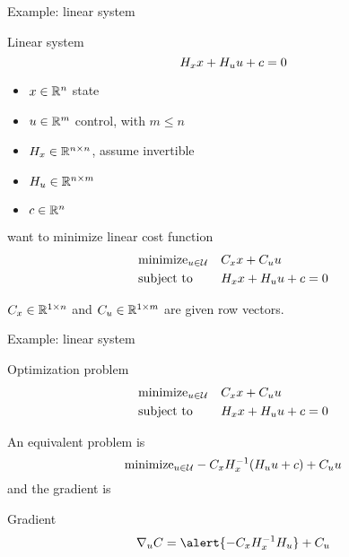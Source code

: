 
\newcommand \xuVector{\left[\begin{array}{c} x \\ u \end{array} \right]}
\begin{frame}{Example: linear system}

\begin{block}{Linear system}
\[
H_x x + H_u u + c = 0
\]
\end{block}

\begin{itemize}
\item $x \in \mathbb{R}^{n}$ state
\item $u \in \mathbb{R}^{m}$ control, with $m \leq n$
\item $H_x \in \mathbb{R}^{n \times n}$, assume invertible
\item $H_u \in \mathbb{R}^{n \times m}$
\item $c \in \mathbb{R}^n$
\end{itemize}

want to minimize linear cost function
\[
\begin{aligned}
&\text{minimize}_{u \in \mathcal{U}} && C_x x + C_u u \\
&\text{subject to} && H_x x + H_u u + c = 0
\end{aligned}
\]

$C_x \in \mathbb{R}^{1\times n}$ and $C_u \in \mathbb{R}^{1 \times m}$ are given row vectors.

\end{frame}


\begin{frame}{Example: linear system}

\begin{block}{Optimization problem}
\[
\begin{aligned}
&\text{minimize}_{u \in \mathcal{U}} && C_x x + C_u u \\
&\text{subject to} && H_x x + H_u u + c = 0
\end{aligned}
\]
\end{block}
An equivalent problem is
\[
\text{minimize}_{u \in \mathcal{U}} - C_x H_x^{-1}(H_u u + c) + C_u u
\]
and the gradient is
\begin{block}{Gradient}
\[
\nabla_u \cost = \alert{- \cost_x \sys_x^{-1} \sys_u} + \cost_u
\]
\end{block}

\end{frame}

